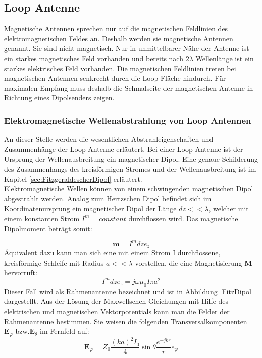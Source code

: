 \subsection{Loop Antenne}
Magnetische Antennen sprechen nur auf die magnetischen Feldlinien des elektromagnetischen Feldes an. Deshalb werden sie magnetische Antennen genannt. Sie sind nicht magnetisch. Nur in unmittelbarer Nähe der Antenne ist ein starkes magnetisches Feld vorhanden und bereits nach $2\lambda$ Wellenlänge ist ein starkes elektrisches Feld vorhanden. Die magnetischen Feldlinien treten bei magnetischen Antennen senkrecht durch die Loop-Fläche hindurch. Für maximalen Empfang muss deshalb die Schmalseite der magnetischen Antenne in Richtung eines Dipolsenders  zeigen.

\subsubsection{Elektromagnetische Wellenabstrahlung von Loop Antennen}
An dieser Stelle werden die wesentlichen Abstrahleigenschaften und Zusammenhänge  der Loop Antenne erläutert.
Bei einer Loop Antenne ist der Ursprung der Wellenausbreitung ein magnetischer Dipol. Eine genaue Schilderung des Zusammenhangs des kreisförmigen Stromes und der Wellenausbreitung ist im Kapitel \ref{sec:FitzgeraldescherDipol} erläutert. \\
Elektromagnetische Wellen können  von einem schwingenden magnetischen Dipol
abgestrahlt werden. Analog zum Hertzschen Dipol befindet sich im Koordinatenursprung
ein magnetischer Dipol der Länge $dz<<\lambda$, welcher mit einem konstanten
Strom $I^{m}=constant$ durchflossen wird. Das magnetische Dipolmoment beträgt somit:

\begin{equation}
\textbf{m}=I^{m}dze_z
\end{equation}
Äquivalent dazu kann man sich eine mit einem Strom I durchflossene, kreisförmige Schleife mit Radius $a<<\lambda$ vorstellen, die eine Magnetisierung $\textbf{M}$ hervorruft:
\begin{equation}
I^{m}dze_{z}=j\omega\mu_{0}I\pi a^{2}
\end{equation}
Dieser Fall wird als Rahmenantenne bezeichnet und ist in Abbildung \ref{FitzDipol} dargestellt. Aus der Lösung der Maxwellschen Gleichungen mit Hilfe des elektrischen und
magnetischen Vektorpotentials kann man die Felder der Rahmenantenne bestimmen.
Sie weisen die folgenden Transversalkomponenten $\textbf{E}_{\varphi}$ bzw.$\textbf{E}_{\theta}$ im Fernfeld auf:
\begin{equation}
\textbf{E}_{\varphi}=Z_{0}\dfrac{(ka)^2I_{0}}{4}\sin \theta \dfrac{e^{-jkr}}{r} e_{\varphi}
\end{equation}

